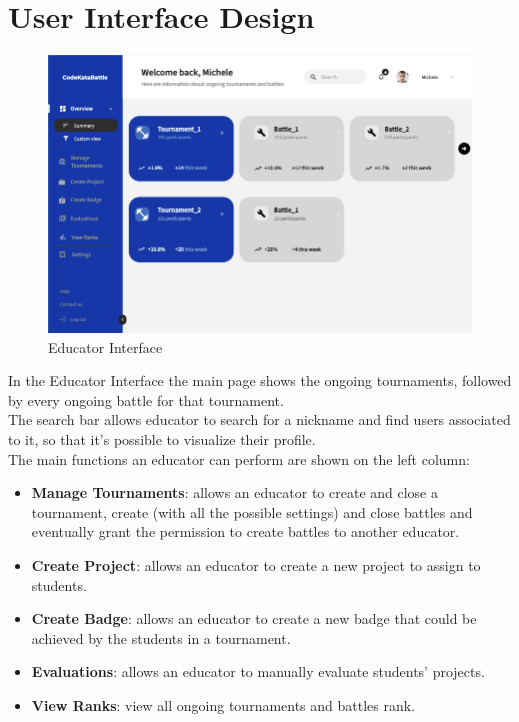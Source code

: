 \section{User Interface Design}

\begin{figure}[h]
    \centering
    \includegraphics[scale=0.5]{src/educator_view.png}
    \caption*{Educator Interface}
\end{figure} \vspace{0.5cm}

In the Educator Interface the main page shows the ongoing tournaments, followed by every ongoing battle for that tournament. \\The search bar allows educator to search for a nickname and find users associated to it, so that it's possible to visualize their profile. \\The main functions an educator can perform are shown on the left column: 
\begin{itemize}
    \item \textbf{Manage Tournaments}: allows an educator to create and close a tournament, create (with all the possible settings) and close battles and eventually grant the permission to create battles to another educator.
    \item \textbf{Create Project}: allows an educator to create a new project to assign to students. 
    \item \textbf{Create Badge}: allows an educator to create a new badge that could be achieved by the students in a tournament.
    \item \textbf{Evaluations}: allows an educator to manually evaluate students' projects.
    \item \textbf{View Ranks}: view all ongoing tournaments and battles rank.
\end{itemize}

